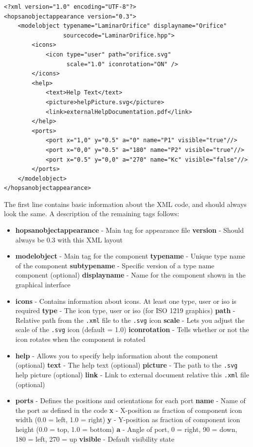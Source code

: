 \documentclass[a4paper,pdftex]{article}
\begin{document}
\begin{minipage}{\linewidth}
\begin{lstlisting}[basicstyle=\small\ttfamily]
<?xml version="1.0" encoding="UTF-8"?>
<hopsanobjectappearance version="0.3">
    <modelobject typename="LaminarOrifice" displayname="Orifice" 
                 sourcecode="LaminarOrifice.hpp">
        <icons>
            <icon type="user" path="orifice.svg" 
                  scale="1.0" iconrotation="ON" />
        </icons>
        <help>
            <text>Help Text</text>
            <picture>helpPicture.svg</picture>
            <link>externalHelpDocumentation.pdf</link>
        </help>
        <ports>
            <port x="1,0" y="0.5" a="0" name="P1" visible="true"//>
            <port x="0,0" y="0.5" a="180" name="P2" visible="true"//>
            <port x="0.5" y="0,0" a="270" name="Kc" visible="false"//>
        </ports>
    </modelobject>
</hopsanobjectappearance>
\end{lstlisting}
\end{minipage}

The first line contains basic information about the XML code, and should always look the same. 
A description of the remaining tags follows:

\begin{itemize}
\item \textbf{hopsanobjectappearance} - Main tag for appearance file
\subitem \textbf{version} - Should always be 0.3 with this XML layout
\item \textbf{modelobject} - Main tag for the component
\subitem \textbf{typename} - Unique type name of the component
\subitem \textbf{subtypename} - Specific version of a type name component (optional)
\subitem \textbf{displayname} - Name for the component shown in the graphical interface
\item \textbf{icons} - Contains information about icons. At least one type, user or iso is required
\subitem \textbf{type} - The icon type, user or iso (for ISO 1219 graphics)
\subitem \textbf{path} - Relative path from the \texttt{.xml} file to the \texttt{.svg} icon
\subitem \textbf{scale} - Lets you adjust the scale of the \texttt{.svg} icon (default = 1.0)
\subitem \textbf{iconrotation} - Tells whether or not the icon rotates when the component is rotated
\item \textbf{help} - Allows you to specify help information about the component (optional)
\subitem \textbf{text} - The help text (optional)
\subitem \textbf{picture} - The path to the \texttt{.svg} help picture (optional)
\subitem \textbf{link} - Link to external document relative this \texttt{.xml} file (optional) 
\item \textbf{ports} - Defines the positions and orientations for each port
\subitem \textbf{name} - Name of the port as defined in the code
\subitem \textbf{x} - X-position as fraction of component icon width (0.0 = left, 1.0 = right)
\subitem \textbf{y} - Y-position as fraction of component icon height (0.0 = top, 1.0 = bottom)
\subitem \textbf{a} - Angle of port, 0 = right, 90 = down, 180 = left, 270 = up
\subitem \textbf{visible} - Default visibility state
\end{itemize}
\end{document}
